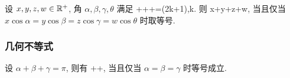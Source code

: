 设 $x,y,z,w\in\mathbb{R}^+$, 角 $\alpha,\beta,\gamma,\theta$ 满足
\bee
\alpha+\beta+\gamma+\theta=(2k+1)\pi,\qquad k\in\ZZ.
\eee
则
\bee
x\sin\alpha+y\sin\beta+z\sin\gamma+w\sin\theta\le {},
\eee
当且仅当 $x\cos\alpha=y\cos\beta=z\cos\gamma=w\cos\theta$ 时取等号.
\eq

\subsubsection{几何不等式}
设 $\alpha+\beta+\gamma=\pi$, 则有
\bee
\sin\alpha+\sin\beta+\sin\gamma\le {},
\eee
当且仅当 $\alpha=\beta=\gamma$ 时等号成立.
\eq

